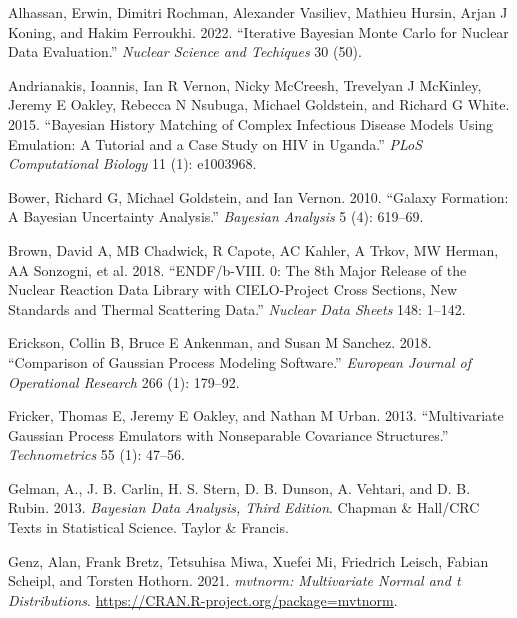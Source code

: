 \documentclass[
  12pt,
  a4paper,
  twoside]{book}
\newlength{\cslhangindent}
\newlength{\cslentryspacingunit} %
\newenvironment{CSLReferences}[2] %
 {%
  \setlength{\parindent}{0pt}
  \ifodd #1
  \let\oldpar\par
  \def\par{\hangindent=\cslhangindent\oldpar}
  \fi
  \setlength{\parskip}{#2\cslentryspacingunit}
 }%
 {}
\begin{document}
\hypertarget{refs}{}
\begin{CSLReferences}{1}{0}
\leavevmode{}%
Alhassan, Erwin, Dimitri Rochman, Alexander Vasiliev, Mathieu Hursin, Arjan J Koning, and Hakim Ferroukhi. 2022. {``Iterative Bayesian Monte Carlo for Nuclear Data Evaluation.''} \emph{Nuclear Science and Techiques} 30 (50).

\leavevmode{}%
Andrianakis, Ioannis, Ian R Vernon, Nicky McCreesh, Trevelyan J McKinley, Jeremy E Oakley, Rebecca N Nsubuga, Michael Goldstein, and Richard G White. 2015. {``Bayesian History Matching of Complex Infectious Disease Models Using Emulation: A Tutorial and a Case Study on HIV in Uganda.''} \emph{PLoS Computational Biology} 11 (1): e1003968.

\leavevmode{}%
Bower, Richard G, Michael Goldstein, and Ian Vernon. 2010. {``Galaxy Formation: A Bayesian Uncertainty Analysis.''} \emph{Bayesian Analysis} 5 (4): 619--69.

\leavevmode{}%
Brown, David A, MB Chadwick, R Capote, AC Kahler, A Trkov, MW Herman, AA Sonzogni, et al. 2018. {``ENDF/b-VIII. 0: The 8th Major Release of the Nuclear Reaction Data Library with CIELO-Project Cross Sections, New Standards and Thermal Scattering Data.''} \emph{Nuclear Data Sheets} 148: 1--142.

\leavevmode{}%
Erickson, Collin B, Bruce E Ankenman, and Susan M Sanchez. 2018. {``Comparison of Gaussian Process Modeling Software.''} \emph{European Journal of Operational Research} 266 (1): 179--92.

\leavevmode{}%
Fricker, Thomas E, Jeremy E Oakley, and Nathan M Urban. 2013. {``Multivariate Gaussian Process Emulators with Nonseparable Covariance Structures.''} \emph{Technometrics} 55 (1): 47--56.

\leavevmode{}%
Gelman, A., J. B. Carlin, H. S. Stern, D. B. Dunson, A. Vehtari, and D. B. Rubin. 2013. \emph{Bayesian Data Analysis, Third Edition}. Chapman \& Hall/CRC Texts in Statistical Science. Taylor \& Francis.

\leavevmode{}%
Genz, Alan, Frank Bretz, Tetsuhisa Miwa, Xuefei Mi, Friedrich Leisch, Fabian Scheipl, and Torsten Hothorn. 2021. \emph{{mvtnorm}: Multivariate Normal and t Distributions}. \url{https://CRAN.R-project.org/package=mvtnorm}.


\end{CSLReferences}
\end{document}
